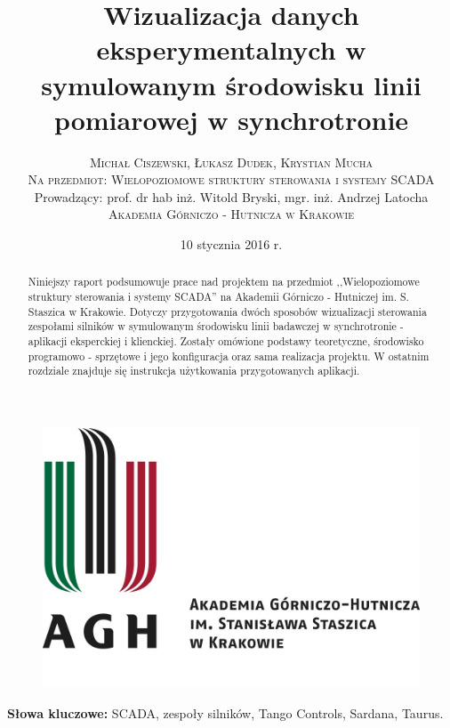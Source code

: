 \documentclass[twoside]{article}
\title{\vspace{-15mm}\fontsize{24pt}{10pt}\selectfont\textbf{Wizualizacja danych eksperymentalnych w symulowanym środowisku linii pomiarowej w synchrotronie}} %
\author{
\large
\textsc{Michał Ciszewski, Łukasz Dudek, Krystian Mucha}\\[3mm] %
\textsc{Na przedmiot: Wielopoziomowe struktury sterowania i systemy SCADA}\\[3mm] %
\normalsize Prowadzący: prof. dr hab inż. Witold Bryski, mgr. inż. Andrzej Latocha\\[9mm]
\textsc{Akademia Górniczo - Hutnicza w Krakowie} %
}
\date{10 stycznia 2016 r.}
\begin{document}
	
\begin{figure}
	\centering
	\includegraphics[width=0.9\linewidth]{Grafika/agh_logo}
	\label{fig:agh-logo}
\end{figure}

\maketitle %

\thispagestyle{fancy} %

\clearpage


\vspace{10mm}
\begin{abstract}

\noindent Niniejszy raport podsumowuje prace nad projektem na przedmiot ,,Wielopoziomowe struktury sterowania i systemy SCADA'' na Akademii Górniczo - Hutniczej im. S. Staszica w Krakowie. Dotyczy przygotowania dwóch sposobów wizualizacji sterowania zespołami silników w symulowanym środowisku linii badawczej w synchrotronie - aplikacji eksperckiej i klienckiej. Zostały omówione podstawy teoretyczne, środowisko programowo - sprzętowe i jego konfiguracja oraz sama realizacja projektu. W ostatnim rozdziale znajduje się instrukcja użytkowania przygotowanych aplikacji.

\end{abstract}

\smallskip
\noindent \textbf{Słowa kluczowe:} SCADA, zespoły silników, Tango Controls, Sardana, Taurus.
\end{document}
